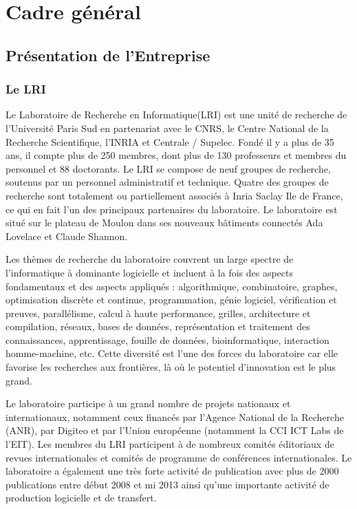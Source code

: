 \chapter{Cadre général}
\label{sec:Cadre général}

\section{Présentation de l’Entreprise}

\subsection{Le LRI}
Le Laboratoire de Recherche en Informatique(LRI) est une unité de recherche de l'Université Paris Sud en partenariat avec le CNRS, le Centre National de la Recherche Scientifique, l'INRIA et Centrale / Supelec. Fondé il y a plus de 35 ans, il compte plus de 250 membres, dont plus de 130 professeurs et membres du personnel et 88 doctorants. Le LRI se compose de neuf groupes de recherche, soutenus par un personnel administratif et technique. Quatre des groupes de recherche sont totalement ou partiellement associés à Inria Saclay Ile de France, ce qui en fait l'un des principaux partenaires du laboratoire. Le laboratoire est situé sur le plateau de Moulon dans ses nouveaux bâtiments connectés Ada Lovelace et Claude Shannon.

Les thèmes de recherche du laboratoire couvrent un large spectre de l'informatique à dominante logicielle et incluent à la fois des aspects fondamentaux et des aspects appliqués : algorithmique, combinatoire, graphes, optimisation discrète et continue, programmation, génie logiciel, vérification et preuves,  parallélisme, calcul à haute performance, grilles, architecture et compilation, réseaux, bases de données, représentation et traitement des connaissances, apprentissage, fouille de données, bioinformatique, interaction homme-machine, etc.  Cette diversité est l'une des forces du laboratoire car elle favorise les recherches aux frontières, là où le potentiel d'innovation est le plus grand.

Le laboratoire participe à un grand nombre de projets nationaux et internationaux, notamment ceux financés par l'Agence National de la Recherche (ANR), par Digiteo et par l'Union européenne (notamment la CCI ICT Labs de l'EIT). Les membres du LRI participent à de nombreux comités éditoriaux de revues internationales et comités de programme de conférences internationales. Le laboratoire a également une très forte activité de publication avec plus de 2000 publications entre début 2008 et mi 2013 ainsi qu'une importante activité de production logicielle et de transfert.

